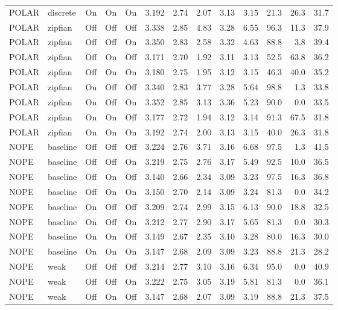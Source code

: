 \begin{longtable}{llcccrrrrrrrr}
POLAR & discrete & On & On & On & 3.192 & 2.74 & 2.07 & 3.13 & 3.15 & 21.3 & 26.3 & 31.7 \\
POLAR & zipfian & Off & Off & Off & 3.338 & 2.85 & 4.83 & 3.28 & 6.55 & 96.3 & 11.3 & 37.9 \\
POLAR & zipfian & Off & Off & On & 3.350 & 2.83 & 2.58 & 3.32 & 4.63 & 88.8 & 3.8 & 39.4 \\
POLAR & zipfian & Off & On & Off & 3.171 & 2.70 & 1.92 & 3.11 & 3.13 & 52.5 & 63.8 & 36.2 \\
POLAR & zipfian & Off & On & On & 3.180 & 2.75 & 1.95 & 3.12 & 3.15 & 46.3 & 40.0 & 35.2 \\
POLAR & zipfian & On & Off & Off & 3.340 & 2.83 & 3.77 & 3.28 & 5.64 & 98.8 & 1.3 & 33.8 \\
POLAR & zipfian & On & Off & On & 3.352 & 2.85 & 3.13 & 3.36 & 5.23 & 90.0 & 0.0 & 33.5 \\
POLAR & zipfian & On & On & Off & 3.177 & 2.72 & 1.94 & 3.12 & 3.14 & 91.3 & 67.5 & 31.8 \\
POLAR & zipfian & On & On & On & 3.192 & 2.74 & 2.00 & 3.13 & 3.15 & 40.0 & 26.3 & 31.8 \\
NOPE & baseline & Off & Off & Off & 3.224 & 2.76 & 3.71 & 3.16 & 6.68 & 97.5 & 1.3 & 41.5 \\
NOPE & baseline & Off & Off & On & 3.219 & 2.75 & 2.76 & 3.17 & 5.49 & 92.5 & 10.0 & 36.5 \\
NOPE & baseline & Off & On & Off & 3.140 & 2.66 & 2.34 & 3.09 & 3.23 & 97.5 & 16.3 & 36.8 \\
NOPE & baseline & Off & On & On & 3.150 & 2.70 & 2.14 & 3.09 & 3.24 & 81.3 & 0.0 & 34.2 \\
NOPE & baseline & On & Off & Off & 3.209 & 2.74 & 2.99 & 3.15 & 6.13 & 90.0 & 18.8 & 32.5 \\
NOPE & baseline & On & Off & On & 3.212 & 2.77 & 2.90 & 3.17 & 5.65 & 81.3 & 0.0 & 30.3 \\
NOPE & baseline & On & On & Off & 3.149 & 2.67 & 2.35 & 3.10 & 3.28 & 80.0 & 16.3 & 30.0 \\
NOPE & baseline & On & On & On & 3.147 & 2.68 & 2.09 & 3.09 & 3.23 & 88.8 & 21.3 & 28.2 \\
NOPE & weak & Off & Off & Off & 3.214 & 2.77 & 3.10 & 3.16 & 6.34 & 95.0 & 0.0 & 40.9 \\
NOPE & weak & Off & Off & On & 3.222 & 2.75 & 3.05 & 3.19 & 5.81 & 81.3 & 0.0 & 36.1 \\
NOPE & weak & Off & On & Off & 3.147 & 2.68 & 2.07 & 3.09 & 3.19 & 88.8 & 21.3 & 37.5 \\

\end{longtable}
